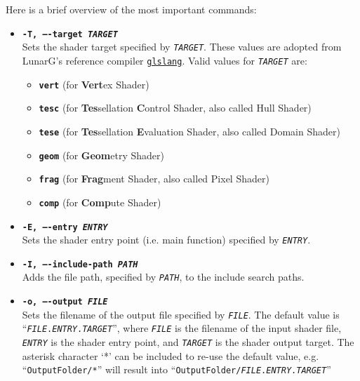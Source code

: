 \documentclass{article}
\begin{document}
Here is a brief overview of the most important commands:
\begin{itemize}
	\item[] \textbf{\texttt{-T, ----target \textit{TARGET}}} \\
	Sets the shader target specified by \texttt{\textit{TARGET}}.
	These values are adopted from LunarG's reference compiler
	\href{https://www.khronos.org/opengles/sdk/tools/Reference-Compiler/}{\texttt{glslang}}.
	Valid values for \texttt{\textit{TARGET}} are:
	\begin{itemize}
		\item[] \textbf{\texttt{vert}} (for \textbf{Vert}ex Shader)
		\item[] \textbf{\texttt{tesc}} (for \textbf{Tes}sellation \textbf{C}ontrol Shader, also called Hull Shader)
		\item[] \textbf{\texttt{tese}} (for \textbf{Tes}sellation \textbf{E}valuation Shader, also called Domain Shader)
		\item[] \textbf{\texttt{geom}} (for \textbf{Geom}etry Shader)
		\item[] \textbf{\texttt{frag}} (for \textbf{Frag}ment Shader, also called Pixel Shader)
		\item[] \textbf{\texttt{comp}} (for \textbf{Comp}ute Shader)
	\end{itemize}
	
	\item[] \textbf{\texttt{-E, ----entry \textit{ENTRY}}} \\
	Sets the shader entry point (i.e. main function) specified by \texttt{\textit{ENTRY}}.
	
	\item[] \textbf{\texttt{-I, ----include-path \textit{PATH}}} \\
	Adds the file path, specified by \texttt{\textit{PATH}}, to the include search paths.
	
	\item[] \textbf{\texttt{-o, ----output \textit{FILE}}} \\
	Sets the filename of the output file specified by \texttt{\textit{FILE}}.
	The default value is ``\texttt{\textit{FILE}.\textit{ENTRY}.\textit{TARGET}}'',
	where \texttt{\textit{FILE}} is the filename of the input shader file, \texttt{\textit{ENTRY}} is the shader entry point,
	and \texttt{\textit{TARGET}} is the shader output target. The asterisk character `*' can be included to
	re-use the default value, e.g. ``\texttt{OutputFolder/*}'' will result into
	``\texttt{OutputFolder/\textit{FILE}.\textit{ENTRY}.\textit{TARGET}}''
	

\end{itemize}
\end{document}
